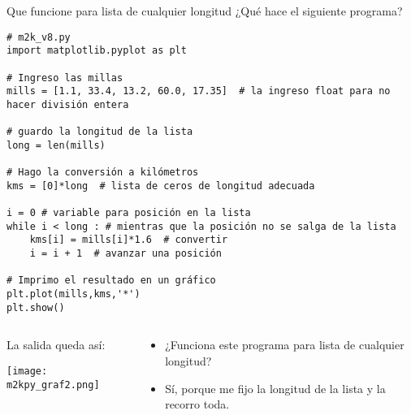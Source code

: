 \documentclass[9pt]{beamer}
\begin{document}
\begin{frame}[fragile]{Que funcione para lista de cualquier longitud}
¿Qué hace el siguiente programa?
\footnotesize{\begin{verbatim}
# m2k_v8.py
import matplotlib.pyplot as plt

# Ingreso las millas
mills = [1.1, 33.4, 13.2, 60.0, 17.35]  # la ingreso float para no hacer división entera

# guardo la longitud de la lista
long = len(mills)

# Hago la conversión a kilómetros
kms = [0]*long  # lista de ceros de longitud adecuada

i = 0 # variable para posición en la lista
while i < long : # mientras que la posición no se salga de la lista
    kms[i] = mills[i]*1.6  # convertir
    i = i + 1  # avanzar una posición

# Imprimo el resultado en un gráfico
plt.plot(mills,kms,'*')
plt.show()
\end{verbatim}}\pause
\begin{columns}
	\begin{column}{0.5\textwidth}
		La salida queda así:\\
\begin{center}
	\texttt{[image: m2kpy\_graf2.png]}\pause
\end{center}
	\end{column}
	\begin{column}{0.5\textwidth}  %
		\begin{itemize}
			\item ¿Funciona este programa para lista de cualquier longitud?\pause
			\item Sí, porque me fijo la longitud de la lista y la recorro toda.
		\end{itemize}
	\end{column}
\end{columns}

\end{frame}
\end{document}
